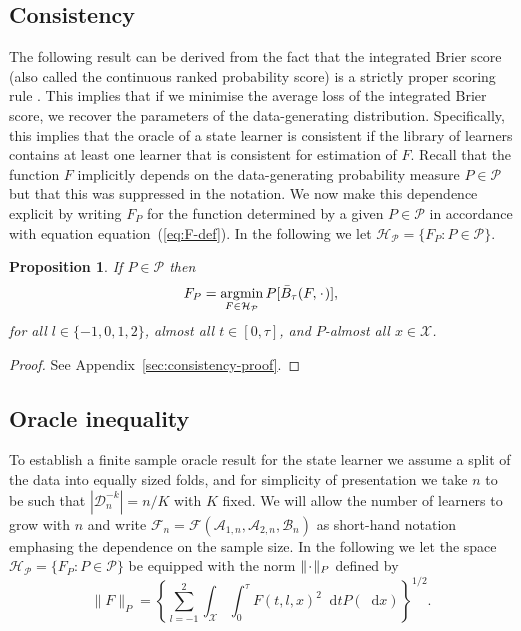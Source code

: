 \documentclass[a4paper,danish]{article}
\theoremstyle{plain} %
\numberwithin{theorem}{section}
\newtheorem{proposition}[theorem]{Proposition}
\theoremstyle{definition} %
\theoremstyle{remark}
\DeclareMathOperator{\E}{\mathbb{E}} %
\newcommand{\blank}{\makebox[1ex]{\textbf{$\cdot$}}}
\newcommand*\diff{\mathop{}\!\mathrm{d}}
\newcommand{\1}{\mathds{1}}
\DeclareMathOperator*{\argmin}{\arg\!\min}
\newcommand{\data}{\ensuremath{\mathcal{D}}}
\begin{document}
\subsection{Consistency}
\label{sec:consistency}

The following result can be derived from the fact
that the integrated Brier score (also called the continuous
ranked probability score) is a strictly proper scoring rule
\citep{gneiting2007strictly}. This implies that if we minimise
the average loss of the integrated Brier score, we recover the
parameters of the data-generating distribution. Specifically,
this implies that the oracle of a state learner is consistent
if the library of learners contains at least one learner that
is consistent for estimation of \( F \). Recall that the
function \(F\) implicitly depends on the data-generating
probability measure \(P\in\mathcal P\) but that this was
suppressed in the notation. We now make this dependence
explicit by writing \(F_P\) for the function determined by a
given \(P \in\mathcal{P}\) in accordance with equation
equation~(\ref{eq:F-def}). In the following we let
\( \mathcal{H}_{\mathcal{P}} = \{F_P : P \in \mathcal{P}\} \).

\begin{proposition}
  \label{prop:stric-prop}
  If \(P \in\mathcal{P}\) then
  \begin{equation*}
    F_P = \argmin_{F \in \mathcal{H}_{\mathcal{P}}} P{[\bar{B}_\tau(F, \blank)]},
  \end{equation*}
  for all \( l \in \{-1, 0, 1, 2 \} \), almost all
  \( t \in [0,\tau] \), and \( P \)-almost all
  \( x \in \mathcal{X} \).
\end{proposition}
\begin{proof}
  See Appendix~\ref{sec:consistency-proof}.
\end{proof}

\subsection{Oracle inequality}
\label{sec:finite-sample-oracle}

To establish a finite sample oracle result for the state learner we
assume a split of the data into equally sized folds, and for
simplicity of presentation we take \( n \) to be such that \(
|\data_n^{-k}| = n/K \) with \( K \) fixed. We will allow the number
of learners to grow with \( n \) and write \(
\mathcal{F}_n=\mathcal{F}(\mathcal{A}_{1,n}, \mathcal{A}_{2,n},
\mathcal{B}_n)\) as short-hand notation emphasing the
dependence on the sample size. In the following we let the space \(
\mathcal{H}_{\mathcal{P}}= \{F_P : P \in \mathcal{P}\} \) be equipped with the norm \( \| \blank
\|_{P} \) defined by
\begin{equation}
  \label{eq:norm}
  \| F \|_{P} = 
  \left\{
    \sum_{l=-1}^{2}\int_{\mathcal{X}} \int_0^{\tau} F(t, l, x)^2 \diff t P( \diff x)
  \right\}^{1/2}.
\end{equation}
\end{document}
